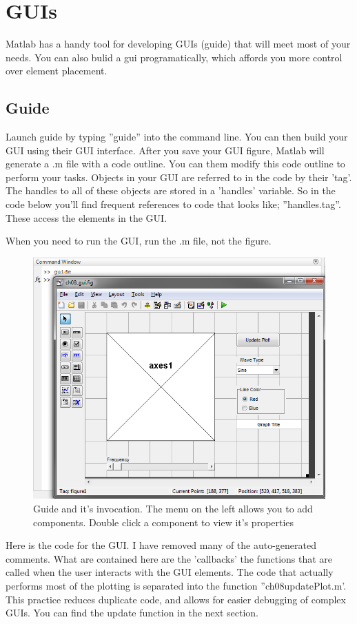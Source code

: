 
\pagebreak
\section{GUIs}
Matlab has a handy tool for developing GUIs (guide) that will meet most of your needs.
 You can also bulid a gui programatically, which affords you more control over element placement.

\subsection{Guide}
Launch guide by typing ''guide'' into the command line.
 You can then build your GUI using their GUI interface.
 After you save your GUI figure, Matlab will generate a .m file with a code outline.
 You can them modify this code outline to perform your tasks.
 Objects in your GUI are referred to in the code by their 'tag'.
 The handles to all of these objects are stored in a 'handles' variable.
 So in the code below you'll find frequent references to code that looks like; ''handles.tag''.
 These access the elements in the GUI.

When you need to run the GUI, run the .m file, not the figure.

\begin{figure}[ht!]
\centering
\includegraphics[width=120mm]{img/guide.png}
\caption{Guide and it's invocation.
 The menu on the left allows you to add components.
 Double click a component to view it's properties}
\label{guiload}
\end{figure}

\pagebreak
Here is the code for the GUI.
 I have removed many of the auto-generated comments.
 What are contained here are the 'callbacks' the functions that are called when the user interacts with the GUI elements.
 The code that actually performs most of the plotting is separated into the function ''ch08updatePlot.m'.
 This practice reduces duplicate code, and allows for easier debugging of complex GUIs.
 You can find the update function in the next section.

